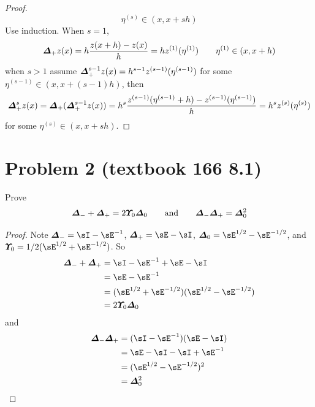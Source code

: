 \documentclass[11pt]{article}
\begin{document}
\begin{enumerate}
\begin{proof}
\[            \eta^{(s)} \in (x, x + sh)
        \]
        Use induction. When $s=1$, 
        \[
             \boldsymbol{\varDelta}_+ z(x) = h \frac{z(x+h) - z(x)}{h} = h z^{(1)}(\eta^{(1)})
             \quad \quad \eta^{(1)} \in (x, x+h)
        \]
        when $s>1$ assume $\boldsymbol{\varDelta}_+^{s-1} z(x) = h^{s-1} z^{(s-1)} (\eta^{(s-1)})$ for some $\eta^{(s-1)} \in (x, x + (s-1)h)$, then 
        \[
            \boldsymbol{\varDelta}_+^s z(x) 
                = \boldsymbol{\varDelta}_+ (\boldsymbol{\varDelta}_+^{s-1} z(x)) 
                = h^s \frac{
                    z^{(s-1)}(\eta^{(s-1)} + h) - z^{(s-1)}(\eta^{(s-1)})
                }{h}
                = h^s z^{(s)} (\eta^{(s)})
        \]
        for some $\eta^{(s)} \in (x, x + sh)$. 
    \end{proof}
\end{enumerate}


\section*{Problem 2 (textbook 166 8.1)}
Prove 
\[
    \boldsymbol{\varDelta}_- + \boldsymbol{\varDelta}_+ = 2\boldsymbol{\varUpsilon}_0\boldsymbol{\varDelta}_0 
    \quad \quad \text{and} \quad \quad
    \boldsymbol{\varDelta}_-\boldsymbol{\varDelta}_+ = \boldsymbol{\varDelta}_0^2    
\]
\begin{proof}
    Note $\back = \id - \shift^{-1}$, $\forw = \shift - \id$, $\cent = \shift^{1/2} - \shift^{-1/2}$, and $\avg = 1/2(\shift^{1/2} + \shift^{-1/2})$. So 
    \begin{align*}
        \back+\forw 
            &= \id - \shift^{-1} + \shift - \id \\
            &= \shift - \shift^{-1} \\
            &= (\shift^{1/2} + \shift^{-1/2})(\shift^{1/2} - \shift^{-1/2}) \\
            &= 2 \avg\cent
    \end{align*}
    and
    \begin{align*}
        \back\forw
            &= (\id - \shift^{-1})(\shift - \id) \\
            &= \shift - \id - \id + \shift^{-1} \\
            &= (\shift^{1/2} - \shift^{-1/2})^2 \\
            &= \cent^2
    \end{align*}
\end{proof}
\end{document}
